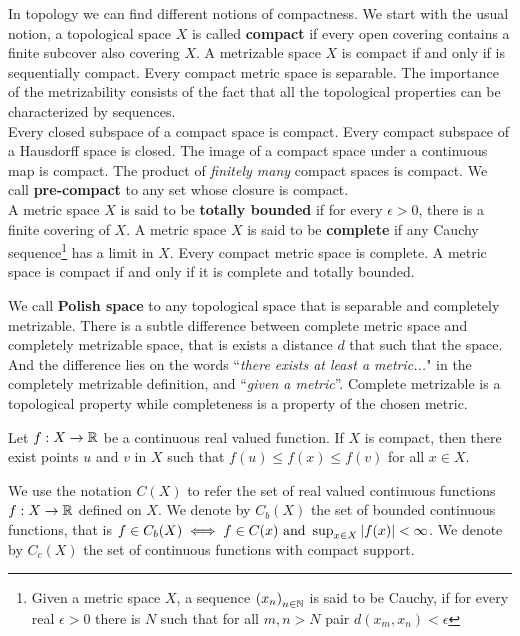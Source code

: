 In topology we can find different notions of compactness. We start with the usual notion, a topological space $X$ is called \textbf{compact} if every open covering contains a finite subcover also covering $X$. A metrizable space $X$ is compact if and only if is sequentially compact. Every compact metric space is separable. The importance of the metrizability consists of the fact that all the topological properties can be characterized by sequences. \\


Every closed subspace of a compact space is compact. Every compact subspace of a Hausdorff space is closed. The image of a compact space under a continuous map is compact. The product of \emph{finitely many} compact spaces is compact. We call \textbf{pre-compact} to any set whose closure is compact. \\

A metric space $X$ is said to be \textbf{totally bounded} if for every $\epsilon>0$, there is a finite covering of $X$. A metric space $X$ is said to be \textbf{complete} if any Cauchy sequence\footnote{Given a metric space $X$, a sequence $\left( x_n \right)_{n\in\mathbb{N}}$ is said to be Cauchy, if for every real $\epsilon>0$ there is $N$ such that for all $m,n>N$ pair $d(x_m, x_n)<\epsilon$} has a limit in $X$. Every compact metric space is complete. 
A metric space is compact if and only if it is complete and totally bounded.

We call \textbf{Polish space} to any topological space that is separable and completely metrizable. There is a subtle difference between complete metric space and completely metrizable space, that is exists a distance $d$ that such that the space.  And the difference lies on the words ``\textit{there exists at least a metric...}" in the completely metrizable definition, and ``\textit{given a metric}''. Complete metrizable is a topological property while completeness is a property of the chosen metric.

\begin{theorem}
	Let $f:X\rightarrow \mathbb{R}$ be a continuous real valued function. If $X$ is compact, then there exist points $u$ and $v$ in $X$ such that $f(u)\leq f(x)\leq f(v)$ for all $x\in X$.
\end{theorem}
 We use the notation $C(X)$ to refer the set of real valued continuous functions $f:X\rightarrow \mathbb{R}$ defined on $X$. We denote by $C_b(X)$ the set of bounded continuous functions, that is $f\in C_b(X) \iff f\in C(x)\ \mathrm{and}\ \sup_{x\in X} \left| f(x) \right|<\infty$. We denote by $C_c(X)$ the set of continuous functions with compact support. \\
  
